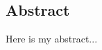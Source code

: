 
\begin{otherlanguage}{english}




\chapter*{Abstract}
\thispagestyle{empty}

Here is my abstract...

\begin{flushleft}
\end{flushleft}

\end{otherlanguage}